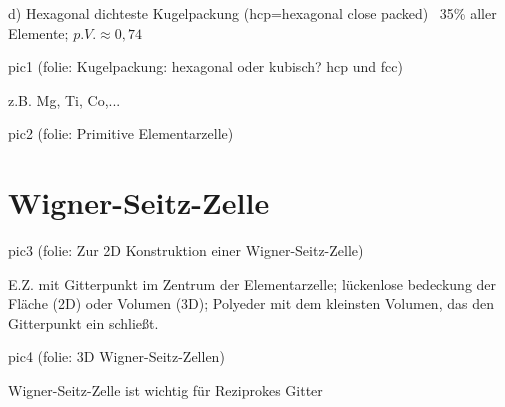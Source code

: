 d) Hexagonal dichteste Kugelpackung (hcp=hexagonal close packed)
~35\% aller Elemente; \(p.V.\approx 0,74\)

pic1 (folie: Kugelpackung: hexagonal oder kubisch? hcp und fcc)

z.B. Mg, Ti, Co,...

pic2 (folie: Primitive Elementarzelle)

\section{Wigner-Seitz-Zelle}

pic3 (folie: Zur 2D Konstruktion einer Wigner-Seitz-Zelle)

E.Z. mit Gitterpunkt im Zentrum der Elementarzelle; lückenlose bedeckung der
Fläche (2D) oder Volumen (3D); Polyeder mit dem kleinsten Volumen, das den
Gitterpunkt ein schließt.

pic4 (folie: 3D Wigner-Seitz-Zellen)

Wigner-Seitz-Zelle ist wichtig für Reziprokes Gitter


